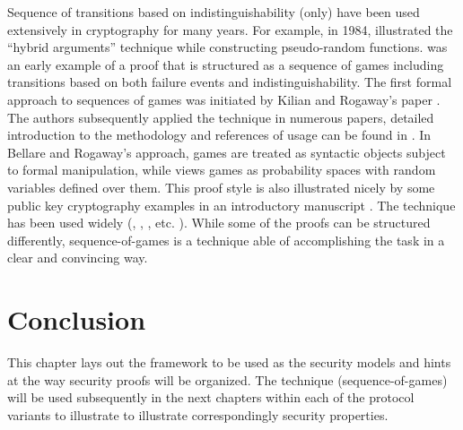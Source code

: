Sequence of transitions based on indistinguishability (only) have been used
extensively in cryptography for many years. For example, in 1984,
\cite{goldreich1984construct} illustrated the ``hybrid arguments'' technique while
constructing pseudo-random functions. \cite{bellare1989new} was an early example
of a proof that is structured as a sequence of games including transitions based
on both failure events and indistinguishability. The first formal approach to
sequences of games was initiated by Kilian and Rogaway's paper
\cite{kilian1996protect}. The authors subsequently applied the technique in
numerous papers, detailed introduction to the methodology and references of usage
can be found in \cite{bellare2004game}. In Bellare and Rogaway's approach, games
are treated as syntactic objects subject to formal manipulation, while
\cite{shoup2004sequences} views games as probability spaces with random variables
defined over them. This proof style is also illustrated nicely by some public
key cryptography examples in an introductory manuscript
\cite{pointcheval2005provable}. The technique has been used widely
(\cite{abdalla2005password}, \cite{boneh2005improved}, \cite{bresson2002group},
etc. ). While some of the proofs can be structured differently,
sequence-of-games is a technique able of accomplishing the task in a clear and
convincing way.

\section{Conclusion}
This chapter lays out the framework to be used as the security models and hints at the way
security proofs will be organized. The technique (sequence-of-games) will
be used subsequently in the next chapters within each of the protocol variants to
illustrate to illustrate correspondingly security properties. 
